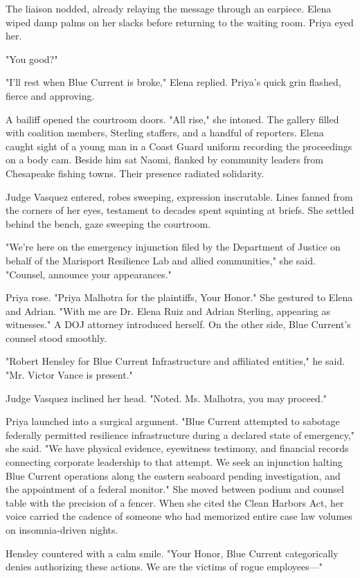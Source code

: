 The liaison nodded, already relaying the message through an earpiece. Elena wiped damp palms on her slacks before returning to the waiting room. Priya eyed her.

"You good?"

"I'll rest when Blue Current is broke," Elena replied. Priya's quick grin flashed, fierce and approving.

A bailiff opened the courtroom doors. "All rise," she intoned. The gallery filled with coalition members, Sterling staffers, and a handful of reporters. Elena caught sight of a young man in a Coast Guard uniform recording the proceedings on a body cam. Beside him sat Naomi, flanked by community leaders from Chesapeake fishing towns. Their presence radiated solidarity.

Judge Vasquez entered, robes sweeping, expression inscrutable. Lines fanned from the corners of her eyes, testament to decades spent squinting at briefs. She settled behind the bench, gaze sweeping the courtroom.

"We're here on the emergency injunction filed by the Department of Justice on behalf of the Marisport Resilience Lab and allied communities," she said. "Counsel, announce your appearances."

Priya rose. "Priya Malhotra for the plaintiffs, Your Honor." She gestured to Elena and Adrian. "With me are Dr. Elena Ruiz and Adrian Sterling, appearing as witnesses." A DOJ attorney introduced herself. On the other side, Blue Current's counsel stood smoothly.

"Robert Hensley for Blue Current Infrastructure and affiliated entities," he said. "Mr. Victor Vance is present."

Judge Vasquez inclined her head. "Noted. Ms. Malhotra, you may proceed."

Priya launched into a surgical argument. "Blue Current attempted to sabotage federally permitted resilience infrastructure during a declared state of emergency," she said. "We have physical evidence, eyewitness testimony, and financial records connecting corporate leadership to that attempt. We seek an injunction halting Blue Current operations along the eastern seaboard pending investigation, and the appointment of a federal monitor." She moved between podium and counsel table with the precision of a fencer. When she cited the Clean Harbors Act, her voice carried the cadence of someone who had memorized entire case law volumes on insomnia-driven nights.

Hensley countered with a calm smile. "Your Honor, Blue Current categorically denies authorizing these actions. We are the victims of rogue employees—"

